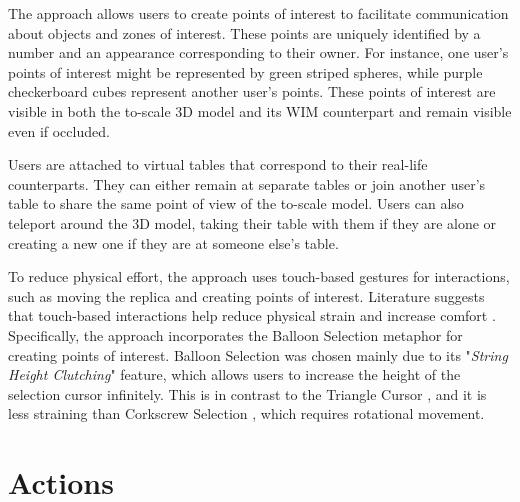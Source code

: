     The approach allows users to create points of interest to facilitate communication about objects and zones of interest. These points are uniquely identified by a number and an appearance corresponding to their owner. For instance, one user's points of interest might be represented by green striped spheres, while purple checkerboard cubes represent another user's points. These points of interest are visible in both the to-scale 3D model and its WIM counterpart and remain visible even if occluded.

    Users are attached to virtual tables that correspond to their real-life counterparts. They can either remain at separate tables or join another user's table to share the same point of view of the to-scale model. Users can also teleport around the 3D model, taking their table with them if they are alone or creating a new one if they are at someone else's table.

    To reduce physical effort, the approach uses touch-based gestures for interactions, such as moving the replica and creating points of interest. Literature suggests that touch-based interactions help reduce physical strain and increase comfort \cite{benkoBalloonSelectionMultiFinger2007, almeidaSIT6IndirectTouchbased2023}. Specifically, the approach incorporates the Balloon Selection metaphor \cite{benkoBalloonSelectionMultiFinger2007} for creating points of interest. Balloon Selection was chosen mainly due to its "\textit{String Height Clutching}" feature, which allows users to increase the height of the selection cursor infinitely. This is in contrast to the Triangle Cursor \cite{strothoffTriangleCursorInteractions2011}, and it is less straining than Corkscrew Selection \cite{daiberBalloonSelectionRevisited2012}, which requires rotational movement.

    
\section{Actions} \label{sec:actions}

